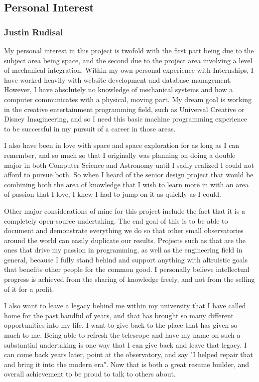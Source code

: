 \documentclass[12pt]{article}
\begin{document}
\subsection{Personal Interest}

\subsubsection{Justin Rudisal}

My personal interest in this project is twofold with the first part being due to the subject area being space, and the second due to the project area involving a level of mechanical integration. Within my own personal experience with Internships, I have worked heavily with website development and database management. However, I have absolutely no knowledge of mechanical systems and how a computer communicates with a physical, moving part. My dream goal is working in the creative entertainment programming field, such as Universal Creative or Disney Imagineering, and so I need this basic machine programming experience to be successful in my pursuit of a career in those areas.

I also have been in love with space and space exploration for as long as I can remember, and so much so that I originally was planning on doing a double major in both Computer Science and Astronomy until I sadly realized I could not afford to pursue both. So when I heard of the senior design project that would be combining both the area of knowledge that I wish to learn more in with an area of passion that I love, I knew I had to jump on it as quickly as I could.

Other major considerations of mine for this project include the fact that it is a completely open-source undertaking. The end goal of this is to be able to document and demonstrate everything we do so that other small observatories around the world can easily duplicate our results. Projects such as that are the ones that drive my passion in programming, as well as the engineering field in general, because I fully stand behind and support anything with altruistic goals that benefits other people for the common good. I personally believe intellectual progress is achieved from the sharing of knowledge freely, and not from the selling of it for a profit.

I also want to leave a legacy behind me within my university that I have called home for the past handful of years, and that has brought so many different opportunities into my life. I want to give back to the place that has given so much to me. Being able to refresh the telescope and have my name on such a substantial undertaking is one way that I can give back and leave that legacy. I can come back years later, point at the observatory, and say "I helped repair that and bring it into the modern era". Now that is both a great resume builder, and overall achievement to be proud to talk to others about.
\end{document}
